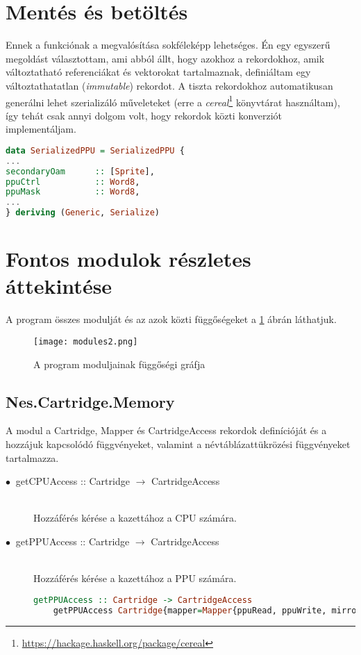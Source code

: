 \section{Mentés és betöltés}

Ennek a funkciónak a megvalósítása sokféleképp lehetséges. Én egy egyszerű megoldást választottam, ami abból állt, hogy azokhoz a rekordokhoz, amik változtatható referenciákat és vektorokat tartalmaznak, definiáltam egy változtathatatlan (\emph{immutable}) rekordot. A tiszta rekordokhoz automatikusan generálni lehet szerializáló műveleteket (erre a \emph{cereal}\footnote{\url{https://hackage.haskell.org/package/cereal}} könyvtárat használtam), így tehát csak annyi dolgom volt, hogy rekordok közti konverziót implementáljam.
\vspace{0.3cm}
\begin{lstlisting}[language=Haskell]
data SerializedPPU = SerializedPPU {
...
secondaryOam      :: [Sprite],
ppuCtrl           :: Word8,
ppuMask           :: Word8,
...
} deriving (Generic, Serialize)
\end{lstlisting}

\section{Fontos modulok részletes áttekintése}

A program összes modulját és az azok közti függőségeket a \ref{fig:modules} ábrán láthatjuk.

\begin{figure}[H]
	\centering
	\texttt{[image: modules2.png]}
	\caption{A program moduljainak függőségi gráfja}
	\label{fig:modules}
\end{figure}

\subsection{Nes.Cartridge.Memory}
A modul a Cartridge, Mapper és CartridgeAccess rekordok definícióját és a hozzájuk kapcsolódó függvényeket, valamint a névtáblázattükrözési függvényeket tartalmazza.

\begin{description}
	\item[$\bullet\:$ getCPUAccess :: Cartridge $\rightarrow$ CartridgeAccess] \hfill \\
	Hozzáférés kérése a kazettához a CPU számára.
	\item[$\bullet\:$ getPPUAccess :: Cartridge $\rightarrow$ CartridgeAccess] \hfill \\
	Hozzáférés kérése a kazettához a PPU számára.
	\begin{lstlisting}[language=Haskell, basicstyle=\scriptsize]
	getPPUAccess :: Cartridge -> CartridgeAccess
	getPPUAccess Cartridge{mapper=Mapper{ppuRead, ppuWrite, mirroringFunction}} = CartridgeAccess ppuRead ppuWrite mirroringFunction
	\end{lstlisting}
\end{description}

